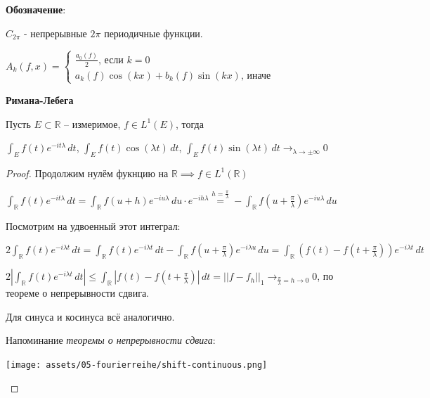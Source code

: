 \begin{remark}
    \textbf{Обозначение}:

    $C_{2\pi}$ - непрерывные $2\pi$ периодичные функции.

    $A_k (f, x) = \begin{cases}
        \frac{a_0(f)}{2} \text{, если $k = 0$} \\
        a_k (f) \cos (kx) + b_k (f) \sin (kx) \text{, иначе}
    \end{cases}$
\end{remark}


\begin{lemma}
    \textbf{Римана-Лебега}

    Пусть $E \subset \mathbb{R}$ -- измеримое, $f \in L^1 (E)$, тогда

    $\int_E f(t) e^{-i t \lambda} \, dt$, $\int_E f(t) \cos (\lambda t) \, dt$, $\int_E f(t) \sin (\lambda t) \, dt \rightarrow_{\lambda \to \pm \infty} 0$
\end{lemma}

\begin{proof}
    Продолжим нулём фукнцию на $\mathbb{R} \implies f \in L^1 (\mathbb{R})$

    $\int_{\mathbb{R}} f(t) e^{-i t \lambda} \, dt = \int_{\mathbb{R}} f(u + h) e^{-iu\lambda} \, du \cdot  e^{-ih\lambda} \overset{h = \frac{\pi}{\lambda}}{=} - \int_{\mathbb{R}} f(u + \frac{\pi}{\lambda}) e^{-iu\lambda} \, du$

    Посмотрим на удвоенный этот интеграл:

    $2 \int_{\mathbb{R}} f(t) e^{-i \lambda t} \, dt = \int_{\mathbb{R}} f(t) e^{-i \lambda t} \, dt - \int_{\mathbb{R}} f(u + \frac{\pi}{\lambda}) e^{-i\lambda u} \, du = \int_{\mathbb{R}} (f(t) - f(t + \frac{\pi}{\lambda})) e^{-i \lambda t} \, dt $

    $2 \left | \int_{\mathbb{R}} f(t) e^{-i \lambda t} \, dt \right | \leqslant \int_{\mathbb{R}} \left | f(t) - f(t + \frac{\pi}{\lambda}) \right | \, dt = || f - f_h ||_1 \rightarrow_{\frac{\pi}{\lambda} = h \to 0} 0$, по теореме о непрерывности сдвига.

    Для синуса и косинуса всё аналогично.


    Напоминание \textit{теоремы о непрерывности сдвига}:

    \begin{center}
        \texttt{[image: assets/05-fourierreihe/shift-continuous.png]}
    \end{center}
\end{proof}

